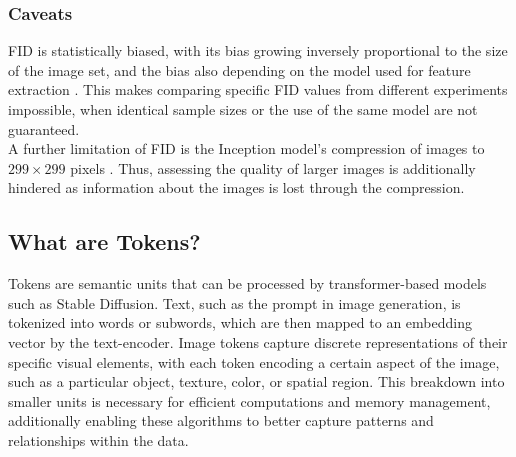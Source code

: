 \subsubsection{Caveats}
FID is statistically biased, with its bias growing inversely proportional to the size of the image set, and the bias also depending on the model used for feature extraction \cite{Chong_2020_CVPR}. This makes comparing specific FID values from different experiments impossible, when identical sample sizes or the use of the same model are not guaranteed.\\
A further limitation of FID is the Inception model's compression of images to $299 \times 299$ pixels \cite{szegedy2016rethinking}. Thus, assessing the quality of larger images is additionally hindered as information about the images is lost through the compression.



\subsection{What are Tokens?}
Tokens are semantic units that can be processed by transformer-based models such as Stable Diffusion. Text, such as the prompt in image generation, is tokenized into words or subwords, which are then mapped to an embedding vector by the text-encoder. Image tokens capture discrete representations of their specific visual elements, with each token encoding a certain aspect of the image, such as a particular object, texture, color, or spatial region. This breakdown into smaller units is necessary for efficient computations and memory management, additionally enabling these algorithms to better capture patterns and relationships within the data.